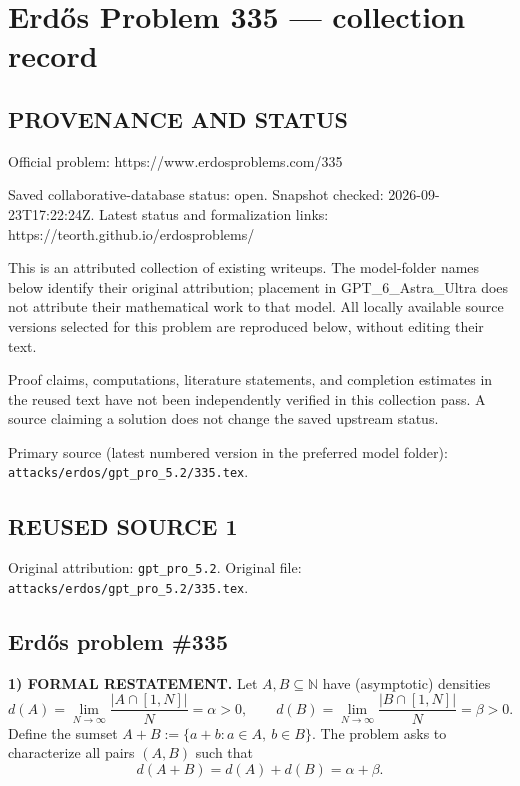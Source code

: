 \section*{Erd\H{o}s Problem 335 --- collection record}

\subsection*{PROVENANCE AND STATUS}
Official problem: https://www.erdosproblems.com/335

Saved collaborative-database status: open.
Snapshot checked: 2026-09-23T17:22:24Z.
Latest status and formalization links: https://teorth.github.io/erdosproblems/

This is an attributed collection of existing writeups. The model-folder names below identify their original attribution; placement in GPT\_6\_Astra\_Ultra does not attribute their mathematical work to that model. All locally available source versions selected for this problem are reproduced below, without editing their text.

Proof claims, computations, literature statements, and completion estimates in the reused text have not been independently verified in this collection pass. A source claiming a solution does not change the saved upstream status.

Primary source (latest numbered version in the preferred model folder): \texttt{attacks/erdos/gpt\_pro\_5.2/335.tex}.

\subsection*{REUSED SOURCE 1}
Original attribution: \texttt{gpt\_pro\_5.2}.
Original file: \texttt{attacks/erdos/gpt\_pro\_5.2/335.tex}.

\subsection*{Erd\H{o}s problem \#335}

\noindent\textbf{1) FORMAL RESTATEMENT.}
Let $A,B\subseteq\mathbb{N}$ have (asymptotic) densities
\[
 d(A)=\lim_{N\to\infty}\frac{|A\cap[1,N]|}{N}=\alpha>0,
 \qquad
 d(B)=\lim_{N\to\infty}\frac{|B\cap[1,N]|}{N}=\beta>0.
\]
Define the sumset $A+B:=\{a+b: a\in A,\ b\in B\}$. The problem asks to characterize all pairs $(A,B)$ such that
\[
 d(A+B)=d(A)+d(B)=\alpha+\beta.
\]


